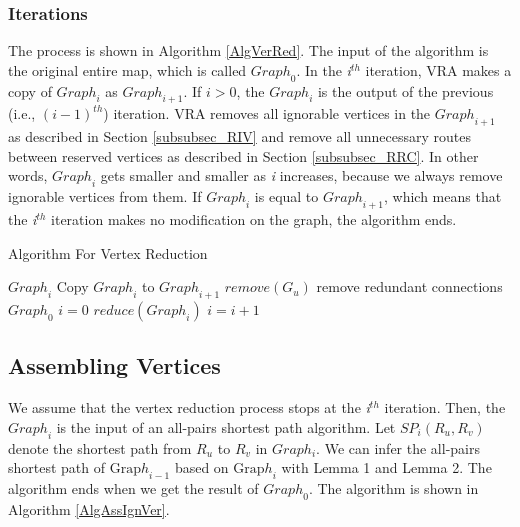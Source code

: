 \subsubsection{ Iterations}

The process is shown in Algorithm \ref{AlgVerRed}. The input of the algorithm is the original entire map, which is called ${Graph}_0$. In the \textit{i}${}^{th}$ iteration, VRA makes a copy of ${Graph}_i$ as ${Graph}_{i+1}$. If $i>0$, the ${Graph}_i$ is the output of the previous (i.e., ${\left(i-1\right)}^{th}$) iteration. VRA removes all ignorable vertices in the ${Graph}_{i+1}$ as described in Section \ref{subsubsec_RIV} and remove all unnecessary routes between reserved vertices as described in Section \ref{subsubsec_RRC}. In other words, ${Graph}_i$ gets smaller and smaller as \textit{i} increases, because we always remove ignorable vertices from them. If ${Graph}_i$ is equal to ${Graph}_{i+1}$, which means that the \textit{i}${}^{th}$ iteration makes no modification on the graph, the algorithm ends.

\begin{algorithm} [hbtp]
\caption{Algorithm For Vertex Reduction}\label{AlgVerRed}
\begin{algorithmic}[1]
 {${Graph}_i$}
\State Copy ${Graph}_i$ to ${Graph}_{i+1}$
	\State $remove(G_u)$
\EndFor
{}
	\State remove redundant connections
\EndFor
\EndProcedure
{} {${Graph}_0$}
\State $i=0$
	\State $reduce({Graph}_i)$
	\State $i=i+1$
\EndWhile
\EndProcedure
\end{algorithmic}
\end{algorithm}

\subsection{ Assembling Vertices}\label{subsecAssVer}

\noindent We assume that the vertex reduction process stops at the \textit{i}${}^{th}$ iteration. Then, the ${Graph}_i$ is the input of an all-pairs shortest path algorithm. Let $SP_i\left(R_u,R_v\right)$ denote the shortest path from $R_u$ to $R_v$ in $Graph_i$. We can infer the all-pairs shortest path of ${\mathrm{Grap}h}_{i-1}$ based on ${\mathrm{Grap}h}_i$ with Lemma 1 and Lemma 2. The algorithm ends when we get the result of ${Graph}_0$. The algorithm is shown in Algorithm \ref{AlgAssIgnVer}.

